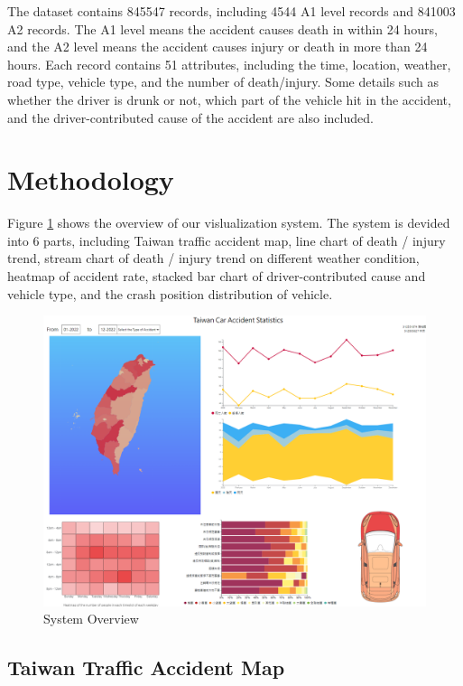 \documentclass[a4paper, oneside, final, 12pt]{scrartcl} %
\begin{document}
The dataset contains 845547 records, 
including 4544 A1 level records and 841003 A2 records.
The A1 level means the accident causes death in within 24 hours,
and the A2 level means the accident causes injury or death in more than 24 hours.
Each record contains 51 attributes, including the time, location,
weather, road type, vehicle type, and the number of death/injury.
Some details such as whether the driver is drunk or not, 
which part of the vehicle hit in the accident, 
and the driver-contributed cause of the accident are also included.

\section{Methodology}

Figure \ref{fig: system_overview} shows the overview of our vislualization system.
The system is devided into 6 parts,
including Taiwan traffic accident map, line chart of death / injury trend, 
stream chart of death / injury trend on different weather condition,
heatmap of accident rate, stacked bar chart of driver-contributed cause and vehicle type,
and the crash position distribution of vehicle.

\begin{figure}[htbp]
  \centering
  \includegraphics[width=1\textwidth]{"./Image/system_overview.png"}
  \caption{System Overview}
  \label{fig: system_overview}
\end{figure}

\subsection{Taiwan Traffic Accident Map}
\end{document}
